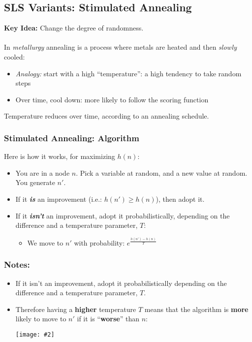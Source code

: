 \documentclass{article}
\def\blu#1{{\color{blu}#1}}
\def\gre#1{{\color{gre}#1}}
\def\red#1{{\color{red}#1}}
\newcommand{\centerfig}[2]{\begin{center}\texttt{[image: \#2]}\end{center}}
\begin{document}
	
\subsection*{SLS Variants: Stimulated Annealing}
\textbf{Key Idea:} Change the degree of randomness. \\ \\
In \textit{metallurgy} \blu{annealing} is a process where metals are heated and then \textit{slowly} cooled:
\begin{itemize}
	\item \textit{Analogy:} start with a high “temperature”: a high tendency to take random steps
	\item Over time, cool down: more likely to follow the scoring function
\end{itemize}
Temperature reduces over time, according to an annealing \blu{schedule}.

\subsubsection*{Stimulated Annealing: Algorithm}
Here is how it works, for maximizing $ h(n) $:
\begin{itemize}[label=$ \rightarrow $]
	\item You are in a node \blu{$ n $}. Pick a variable at random, and a new value at random. You generate \blu{$ n' $}.
	\item If it \textbf{\textsl{\gre{is}}} an improvement (i.e.: $ h(n') \geq h(n) $), then adopt it. 
	\item If it \textbf{\textsl{\red{isn't}}} an improvement, adopt it probabilistically, depending on the difference and a temperature parameter, $ T $:
	\begin{itemize}
		\item We move to $ n' $ with probability: $ e^{\frac{h(n')-h(n)}{T}} $
	\end{itemize}
\end{itemize}

\subsubsection*{Notes:}
\begin{itemize}
	\item If it isn't an improvement, adopt it probabilistically depending on the difference and a temperature parameter, $ T $. 
	\item Therefore having a \textbf{\red{higher}} temperature $ T $ means that the algorithm is \textbf{\blu{more}} likely to move to $ n' $ if it is “\textbf{\red{worse}}” than $ n $:
	\centerfig{0.75}{prob_T}
\end{itemize}
\end{document}
